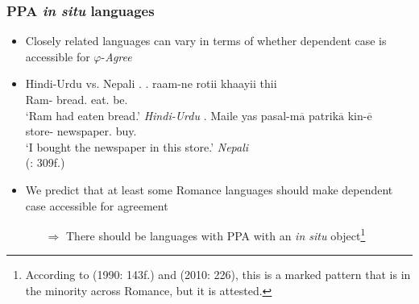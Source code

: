 \documentclass[letterpaper,10pt]{handout_nick}
\begin{document}
\subsubsection{PPA \emph{in situ} languages}
\begin{itemize}
\item Closely related languages can vary in terms of whether dependent case is accessible for $\varphi$-\emph{Agree}
\item Hindi-Urdu vs. Nepali
\ex. \ag. raam-ne rotii khaayii thii\\
Ram- bread. eat. be.\\
`Ram had eaten bread.' \hfill \emph{Hindi-Urdu}
\bg. Maile yas pasal-m$\overline{\text{a}}$ patrik$\overline{\text{a}}$ kin-$\overline{\text{e}}$\\
  store- newspaper. buy.\\
`I bought the newspaper in this store.' \hfill \emph{Nepali}\\
(\citealt{bobaljik08}: 309f.)

\item We predict that at least some Romance languages should make dependent case accessible for agreement
\begin{itemize}
\item[$\Rightarrow$] There should be languages with PPA with an \emph{in situ} object\footnote{According to \citeauthor{belletti90} (1990: 143f.) and \citeauthor{loporcaro10} (2010: 226), this is a marked pattern that is in the minority across Romance, but it is attested.}
\end{itemize}


\end{itemize}
\end{document}
